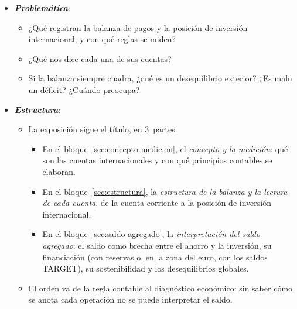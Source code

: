 \documentclass[11pt]{article}
\begin{document}
\begin{itemize}
\item \textbf{\emph{Problemática}}:
  \begin{itemize}
  \item ¿Qué registran la balanza de pagos y la posición de inversión internacional, y con qué reglas se miden?
  \item ¿Qué nos dice cada una de sus cuentas?
  \item Si la balanza siempre cuadra, ¿qué es un desequilibrio exterior? ¿Es malo un déficit? ¿Cuándo preocupa?
  \end{itemize}

\item \textbf{\emph{Estructura}}:
  \begin{itemize}
  \item La exposición sigue el título, en 3~partes:
  \begin{itemize}
  \item En el bloque~\ref{sec:concepto-medicion}, el \emph{concepto y la medición}: qué son las cuentas internacionales y con qué principios contables se elaboran.
  \item En el bloque~\ref{sec:estructura}, la \emph{estructura de la balanza y la lectura de cada cuenta}, de la cuenta corriente a la posición de inversión internacional.
  \item En el bloque~\ref{sec:saldo-agregado}, la \emph{interpretación del saldo agregado}: el saldo como brecha entre el ahorro y la inversión, su financiación (con reservas o, en la zona del euro, con los saldos TARGET), su sostenibilidad y los desequilibrios globales.
  \end{itemize}
  \item El orden va de la regla contable al diagnóstico económico: sin saber cómo se anota cada operación no se puede interpretar el saldo.
  \end{itemize}
\end{itemize}
\end{document}

